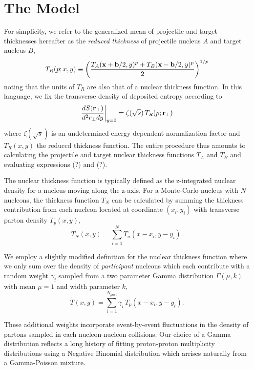 \documentclass[aps,prl,reprint,amsmath,nofootinbib]{revtex4-1}
\begin{document}
\section{The Model}

For simplicity, we refer to the generalized mean of projectile and target thicknesses hereafter as the \emph{reduced thickness} of projectile nucleus $A$ and 
target nucleus $B$,
\begin{equation}
 T_R(p;x,y) \equiv \left( \frac{T_A({\bf x}+{\bf b}/2,y)^p + T_B({\bf x}-{\bf b}/2,y)^p}{2} \right)^{1/p}
\end{equation}
noting that the units of $T_R$ are also that of a nuclear thickness function. In this language, we fix the transverse density of deposited entropy according to
\begin{equation}
 \frac{dS({\bf r}_\perp)}{d^2r_\perp dy} \biggr \rvert_{y=0} = \zeta(\sqrt{s})\, T_R(p;{\bf r}_\perp)
\end{equation}
where $\zeta(\sqrt{s})$ is an undetermined energy-dependent normalization factor and $T_R(x,y)$ the reduced thickness function. The entire procedure thus amounts to calculating the projectile and target 
nuclear thickness functions $T_A$ and $T_B$ and evaluating expressions (?) and (?).

The nuclear thickness function is typically defined as the z-integrated nuclear density for a nucleus moving along the z-axis. For a Monte-Carlo nucleus with $N$ nucleons, the 
thickness function $T_N$ can be calculated by summing the thickness contribution from each nucleon located at coordinate $(x_i,y_i)$ with transverse parton density $T_p(x,y)$,
\begin{equation}
  T_N(x,y) = \sum\limits_{i=1}^{N} T_n(x-x_i,y-y_i).
\end{equation}

We employ a slightly modified definition for the nuclear thickness function where we only sum over the density of \emph{participant} nucleons which each
contribute with a random weight $\gamma_i$ sampled from a two parameter Gamma distribution $\Gamma(\mu,k)$ with mean $\mu=1$ and width parameter $k$,
\begin{equation}
 \tilde{T}(x,y) = \sum\limits_{i=1}^{N_{part}} \gamma_i\, T_p(x-x_i,y-y_i).
\end{equation}

These additional weights incorporate event-by-event fluctuations in the density of partons sampled in each nucleon-nucleon collisions. Our choice of
a Gamma distribution reflects a long history of fitting proton-proton multiplicity distributions using a Negative Binomial distribution which arrises naturally 
from a Gamma-Poisson mixture.
\end{document}
